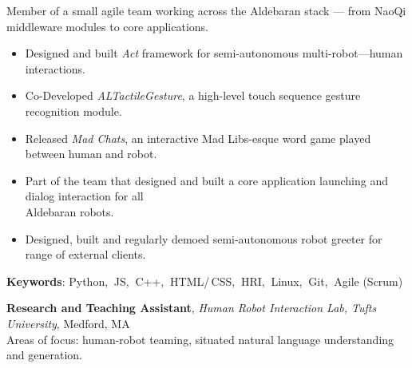 \documentclass[10pt, letter]{article}
\newcommand{\years}[1]{\marginnote{\footnotesize #1}}
\newenvironment{desc*}{
  \begin{description}
    \setlength{\itemsep}{0.2pt}
    \setlength{\parskip}{-1pt}
    \setlength{\parsep}{0pt}
  }{
  \end{description}
}
\begin{document}
\vspace{-.3cm} 
Member of a small agile team working across the Aldebaran stack --- from NaoQi middleware modules to core applications.
\begin{itemize}[leftmargin=*, parsep=-1pt]
\item Designed and built \textit{Act} framework for semi-autonomous
  multi-robot---human interactions.
\item Co-Developed \textit{ALTactileGesture}, a high-level touch sequence
  gesture recognition module.
\item Released \textit{Mad Chats}, an interactive Mad Libs-esque word
  game played between human and robot.
\item Part of the team that designed and built a core
  application launching and dialog interaction for all\\
  Aldebaran robots.
\item Designed, built and regularly demoed semi-autonomous robot
  greeter for range of external clients.
\end{itemize}
\vspace{-.2cm}
\begin{desc*}
\item[\rm \color{redblue} \textbf{Keywords}:] Python,$\:$ JS,$\:$ C++,$\:$ HTML/\,CSS,$\:$
  HRI,$\:$ Linux,$\:$ Git,$\:$ Agile (Scrum)\\
\end{desc*}

\vspace{-.2cm}
\years{2012 - 2014} 
\textbf{\fontsize{10.5pt}{1em}\selectfont Research and Teaching Assistant}, 
\textit{Human Robot Interaction Lab, Tufts University}, Medford, MA\\ 

\vspace{-.3cm} 
Areas of focus: human-robot teaming, situated natural language understanding and generation. 

\vspace{-.3cm} 
\end{document}
